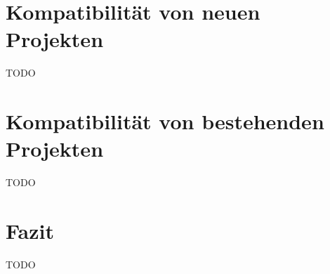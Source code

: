   \label{compabitility}

\section{Kompatibilität von neuen Projekten} \label{sec:compabitility-newProjects}
TODO \\

\section{Kompatibilität von bestehenden Projekten} \label{sec:compabitility-existingProjects}
TODO \\

\section{Fazit} \label{sec:compabitility-conclusion}
TODO \\